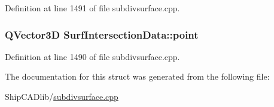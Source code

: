 Definition at line 1491 of file subdivsurface.\-cpp.

\hypertarget{structSurfIntersectionData_a789d1758e7035fdf5b902861e936113a}{
\subsubsection[{point}]{\setlength{\rightskip}{0pt plus 5cm}Q\-Vector3\-D Surf\-Intersection\-Data\-::point}}\label{structSurfIntersectionData_a789d1758e7035fdf5b902861e936113a}


Definition at line 1490 of file subdivsurface.\-cpp.



The documentation for this struct was generated from the following file\-:\begin{DoxyCompactItemize}
\item 
Ship\-C\-A\-Dlib/\hyperlink{subdivsurface_8cpp}{subdivsurface.\-cpp}\end{DoxyCompactItemize}
